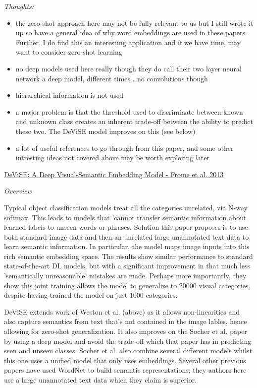 \documentclass{report}
\begin{document}
\textit{Thoughts:}
\begin{itemize}
    \item the zero-shot approach here may not be fully relevant to us but I still wrote it up so have a general idea of why word embeddings are used in these papers. Further, I do find this an interesting application and if we have time, may want to consider zero-shot learning
    \item no deep models used here really though they do call their two layer neural network a deep model, different times \dots no convolutions though
    \item hierarchical information is not used
    \item a major problem is that the threshold used to discriminate between known and unknown class creates an inherent trade-off between the ability to predict these two. The DeViSE model improves on this (see below)
    \item a lot of useful references to go through from this paper, and some other intresting ideas not covered above may be worth exploring later \\
\end{itemize}

\underline{DeViSE: A Deep Visual-Semantic Embedding Model - Frome et al. 2013}

\textit{Overview}

Typical object classification models treat all the categories unrelated, via N-way softmax. This leads to models that 'cannot transfer semantic information about learned labels to unseen words or phrases. Solution this paper proposes is to use both standard image data and then an unrelated large unannotated text data to learn semantic information. In particular, the model maps image inputs into this rich semantic embedding space. The results show similar performance to standard state-of-the-art DL models, but with a significant improvement in that much less 'semantically unreasonable' mistakes are made. Perhaps more importantly, they show this joint training allows the model to generalize to 20000 visual categories, despite having trained the model on just 1000 categories.

DeViSE extends work of Weston et al. (above) as it allows non-linearities and also capture semantics from text that's not contained in the image lables, hence allowing for zero-shot generalization. It also improves on the Socher et al. paper by using a deep model and avoid the trade-off which that paper has in predicting seen and unseen classes. Socher et al. also combine several different models whilst this one uses a unified model that only uses embeddings. Several other previous papers have used WordNet to build semantic representations; they authors here use a large unannotated text data which they claim is superior.
\end{document}
